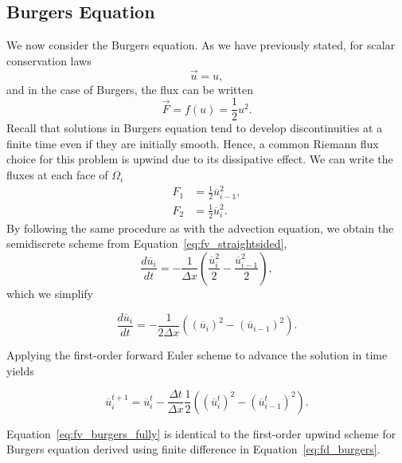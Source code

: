\subsection{Burgers Equation}
We now consider the Burgers equation. As we have previously stated, for scalar conservation laws
\begin{equation}
 \vec{u} = u,
\end{equation}
and in the case of Burgers, the flux can be written
\begin{equation}
 \vec{F} = f(u) = \frac{1}{2} u^2.
\end{equation}
Recall that solutions in Burgers equation tend to develop discontinuities at a finite time even if they are initially smooth. Hence, a common Riemann flux choice for this problem is upwind due to its dissipative effect. We can write the fluxes at each face of $\Omega_i$
\begin{align}
 F_1 &= \frac{1}{2} \overline u_{i-1}^2, \\ 
 F_2 &= \frac{1}{2} \overline u_{i}^2.
\end{align}
By following the same procedure as with the advection equation, we obtain the semidiscrete scheme from Equation~\ref{eq:fv_straightsided}, 
\begin{equation}
 \frac{d\overline u_i}{dt} = - \frac{1}{\Delta x} \left(\frac{\overline u_i^2}{2} - \frac{\overline u_{i-1}^2}{2}\right),
\end{equation}
which we simplify
\begin{eqBox}
\begin{equation}
 \frac{d\overline u_i}{dt} = - \frac{1}{2 \Delta x} \left(\left(\overline u_i\right)^2 - \left(\overline u_{i-1}\right)^2\right).
 \label{eq:fv_burgers}
\end{equation}
\end{eqBox}
Applying the first-order forward Euler scheme to advance the solution in time yields
\begin{eqBox}
	\begin{equation}
	 \overline u_i^{t+1} = \overline u_i^t - \frac{\Delta t}{\Delta x} \frac{1}{2} \left(\left(\overline u_i^t\right)^2 - \left(\overline u_{i-1}^t \right)^2\right).
	 \label{eq:fv_burgers_fully}
	\end{equation}
\end{eqBox}
Equation~\ref{eq:fv_burgers_fully} is identical to the first-order upwind scheme for Burgers equation derived using finite difference in Equation~\ref{eq:fd_burgers}.
